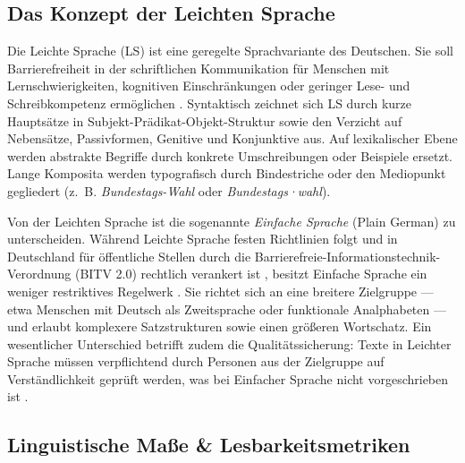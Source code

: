 \label{sec:theoretischer_hintergrund}

\subsection{Das Konzept der Leichten Sprache}
\label{sec:konzept_leichte_sprache}

Die Leichte Sprache (LS) ist eine geregelte Sprachvariante des Deutschen. Sie soll Barrierefreiheit in der schriftlichen Kommunikation für Menschen mit Lernschwierigkeiten, kognitiven Einschränkungen oder geringer Lese- und Schreibkompetenz ermöglichen \citep{bmas2025ratgeber}. Syntaktisch zeichnet sich LS durch kurze Hauptsätze in Subjekt-Prädikat-Objekt-Struktur sowie den Verzicht auf Nebensätze, Passivformen, Genitive und Konjunktive aus. Auf lexikalischer Ebene werden abstrakte Begriffe durch konkrete Umschreibungen oder Beispiele ersetzt. Lange Komposita werden typografisch durch Bindestriche oder den Mediopunkt gegliedert (z.~B. \textit{Bundestags-Wahl} oder \textit{Bundestags·wahl}).

Von der Leichten Sprache ist die sogenannte \textit{Einfache Sprache} (Plain German) zu unterscheiden. Während Leichte Sprache festen Richtlinien folgt und in Deutschland für öffentliche Stellen durch die Barrierefreie-Informationstechnik-Verordnung (BITV 2.0) rechtlich verankert ist \citep{bitv2019}, besitzt Einfache Sprache ein weniger restriktives Regelwerk \citep{bund2026barrierefreiheit}. Sie richtet sich an eine breitere Zielgruppe — etwa Menschen mit Deutsch als Zweitsprache oder funktionale Analphabeten — und erlaubt komplexere Satzstrukturen sowie einen größeren Wortschatz. Ein wesentlicher Unterschied betrifft zudem die Qualitätssicherung: Texte in Leichter Sprache müssen verpflichtend durch Personen aus der Zielgruppe auf Verständlichkeit geprüft werden, was bei Einfacher Sprache nicht vorgeschrieben ist \citep{bund2026barrierefreiheit}.

\subsection{Linguistische Maße \& Lesbarkeitsmetriken}
\label{sec:linguistische_masse_lesbarkeit}

